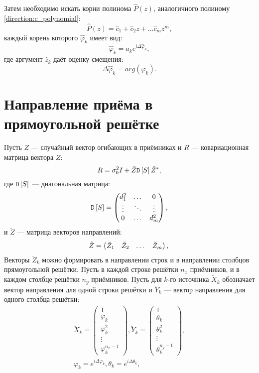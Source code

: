 Затем необходимо искать корни полинома $\widehat{P}(z)$, аналогичного полиному \eqref{direction:c_polynomial}:
\[
    \widehat{P}(z)
    = \widehat{c}_1 + \widehat{c}_2 z + \dots \widehat{c}_m z^m ,
\]
каждый корень которого $\widehat{\varphi}_k$ имеет вид:
\[
    \widehat{\varphi}_k
    = a_k e^{i \Delta \widehat{\varphi}_k} ,
\]
где аргумент $\widehat{z}_k$ даёт оценку смещения:
\[
    \Delta \widehat{\varphi}_k
    = arg \left( \widehat{\varphi}_k \right).
\]

\section{Направление приёма в прямоугольной решётке}

Пусть $Z$ --- случайный вектор огибающих в приёмниках и $R$ --- ковариационная матрица вектора $Z$:
\[
    R = \sigma_0^2 I + \breve{Z} \mathtt{D} \left[ S \right] \breve{Z}^* ,
\]
где $\mathtt{D} \left[ S \right]$ --- диагональная матрица:
\[
    \mathtt{D} \left[ S \right]
    = \begin{pmatrix}
        d_1^2  & \dots  & 0      \\
        \vdots & \ddots & \vdots \\
        0      & \dots  & d_m^2
    \end{pmatrix} ,
\]
и $\breve{Z}$ --- матрица векторов направлений:
\[
    \breve{Z}
    = \begin{pmatrix}
        \breve{Z}_1 & \breve{Z}_2 & \dots & \breve{Z}_m
    \end{pmatrix} , \\
\]
Векторы $\breve{Z}_k$ можно формировать в направлении строк и в направлении столбцов прямоугольной решётки. Пусть в каждой строке решётки $n_x$ приёмников, и в каждом
столбце решётки $n_y$ приёмников. Пусть для $k$-го источника $\breve{X}_k$ обозначает вектор направления для одной строки решётки и $\breve{Y}_k$ --- вектор
направления для одного столбца решётки:
\begin{gather*}
    \breve{X}_k
    = \begin{pmatrix}
        1           \\
        \varphi_k   \\
        \varphi_k^2 \\
        \vdots      \\
        \varphi_k^{n_x-1}
    \end{pmatrix} ,
    \breve{Y}_k
    = \begin{pmatrix}
        1          \\
        \theta_k   \\
        \theta_k^2 \\
        \vdots     \\
        \theta_k^{n_y - 1}
    \end{pmatrix} , \\
    \varphi_k = e^{i \Delta \varphi_k} ,
    \theta_k = e^{i \Delta \theta_k} ,
\end{gather*}
